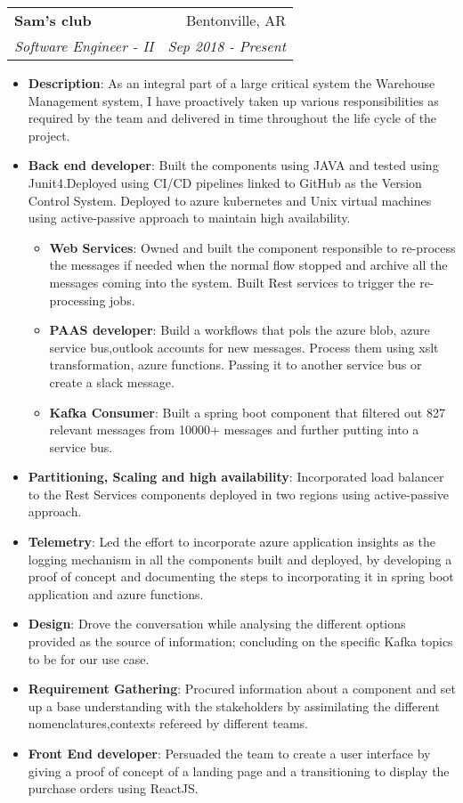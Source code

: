 \documentclass[letterpaper,11pt]{article}
\makeatletter
\newcommand{\resumeItem}[2]{
  \item\small{
    \textbf{#1}{: #2 \vspace{-2pt}}
  }
}
\newcommand{\resumeSubheading}[4]{
  \vspace{-1pt}\item
    \begin{tabular*}{0.97\textwidth}{l@{\extracolsep{\fill}}r}
      \textbf{#1} & #2 \\
      \textit{\small#3} & \textit{\small #4} \\
    \end{tabular*}\vspace{-5pt}
}
\newcommand{\resumeItemListStart}{\begin{itemize}}
\newcommand{\resumeItemListEnd}{\end{itemize}\vspace{-5pt}}
\makeatother
\begin{document}
    \resumeSubheading
      {Sam's club}{Bentonville, AR}
      {Software Engineer - II}{Sep 2018 - Present}
      \resumeItemListStart
       \resumeItem{Description}
        {As an integral part of a large critical system the Warehouse Management system, I have proactively taken up various responsibilities as required by the team and delivered in time throughout the life cycle of the project.}\\
        \resumeItem{Back end developer}
            {Built the components using JAVA and tested using Junit4.Deployed using CI/CD pipelines linked to GitHub as the Version Control System. Deployed to azure kubernetes and Unix virtual machines using active-passive approach to maintain high availability.}\\
            \resumeItemListStart
                \resumeItem{Web Services}
                    {Owned and built the component responsible to re-process the messages if needed when the normal flow stopped and archive all the messages coming into the system. Built Rest services to trigger the re-processing jobs.}\\
                \resumeItem{PAAS developer}
                    {Build a workflows that pols the azure blob, azure service bus,outlook accounts for new messages. Process them using xslt transformation, azure functions. Passing it to another service bus or create a slack message.}\\
                \resumeItem{Kafka Consumer}
                     {Built a spring boot component that filtered out 827 relevant messages from 10000+ messages and further putting into a service bus.}\\
            \resumeItemListEnd
        \resumeItem{Partitioning, Scaling and high availability}
          {Incorporated load balancer to the Rest Services components deployed in two regions using active-passive approach.}\\
        \resumeItem{Telemetry}
          {Led the effort to incorporate azure application insights as the logging mechanism in all the components built and deployed, by developing a proof of concept and documenting the steps to incorporating it in spring boot application and azure functions.}\\
        \resumeItem{Design}
          {Drove the conversation while analysing the different options provided as the source of information; concluding on the specific Kafka topics to be for our use case.}\\
        \resumeItem{Requirement Gathering}
          {Procured information about a component and set up a base understanding with the stakeholders by assimilating the different nomenclatures,contexts refereed by different teams.}\\
        \resumeItem{Front End developer}
          {Persuaded the team to create a user interface by giving a proof of concept of a landing page and a transitioning to display the purchase orders using ReactJS.}
      \resumeItemListEnd
\end{document}
